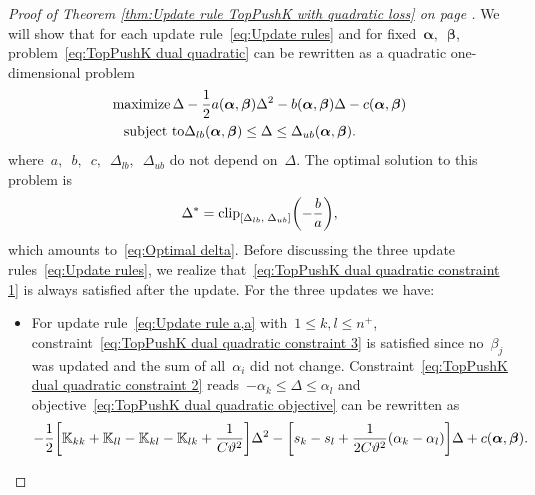 \toppushkupdatequadratic*
\begin{proof}[Proof of Theorem \ref{thm:Update rule TopPushK with quadratic loss} on page \pageref{thm:Update rule TopPushK with quadratic loss}]
  We will show that for each update rule~\eqref{eq:Update rules} and for fixed~$\bm{\alpha},$~$\bm{\beta}$, problem~\eqref{eq:TopPushK dual quadratic} can be rewritten as a quadratic one-dimensional problem
  \begin{align*}
    \operatorname*{maximize}_{}{\Delta}
    & -\frac{1}{2} a(\bm{\alpha}, \bm{\beta}) \Delta^2 - b(\bm{\alpha}, \bm{\beta}) \Delta - c(\bm{\alpha}, \bm{\beta}) \\
    \operatorname{subject\ to}
    & \Delta_{lb}(\bm{\alpha}, \bm{\beta}) \leq \Delta \leq \Delta_{ub}(\bm{\alpha}, \bm{\beta}).
  \end{align*}
  where~$a,$~$b,$~$c,$~$\Delta_{lb},$~$\Delta_{ub}$ do not depend on~$\Delta.$ The optimal solution to this problem is
  \begin{equation}\label{eq:Delta_optimal}
    \Delta^* = \clip{\Delta_{lb}}{\Delta_{ub}}{-\frac{b}{a}},
  \end{equation}
  which amounts to~\eqref{eq:Optimal delta}. Before discussing the three update rules~\eqref{eq:Update rules}, we realize that~\eqref{eq:TopPushK dual quadratic constraint 1} is always satisfied after the update. For the three updates we have:
  \begin{itemize}
    \item For update rule~\eqref{eq:Update rule a,a} with~$1\le k, l \le n^+$, constraint~\eqref{eq:TopPushK dual quadratic constraint 3} is satisfied since no~$\beta_j$ was updated and the sum of all~$\alpha_i$ did not change. Constraint~\eqref{eq:TopPushK dual quadratic constraint 2} reads~$-\alpha_k \leq \Delta \leq \alpha_l$ and objective~\eqref{eq:TopPushK dual quadratic objective} can be rewritten as
    \begin{equation*}
      - \frac{1}{2} \Brac[s]{\K_{kk} + \K_{ll} - \K_{kl} - \K_{lk} + \frac{1}{C\vartheta^2}} \Delta^2 - \Brac[s]{s_k - s_l + \frac{1}{2C\vartheta^2}(\alpha_k - \alpha_l)} \Delta + c(\bm{\alpha}, \bm{\beta}).
    \end{equation*}


\end{itemize}
\end{proof}

